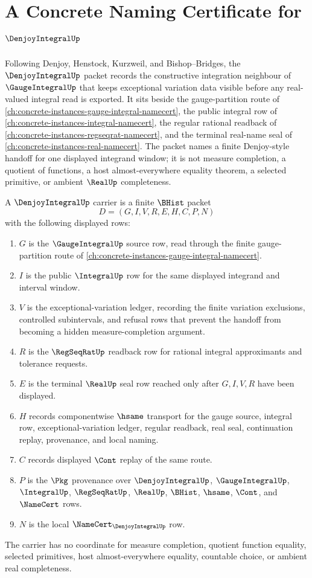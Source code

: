 \chapter{A Concrete Naming Certificate for $\DenjoyIntegralUp$}
\label{ch:concrete-instances-denjoy-integral-namecert}

Following Denjoy, Henstock, Kurzweil, and Bishop--Bridges, the $\DenjoyIntegralUp$ packet records the constructive integration neighbour of $\GaugeIntegralUp$ that keeps exceptional variation data visible before any real-valued integral read is exported. It sits beside the gauge-partition route of \autoref{ch:concrete-instances-gauge-integral-namecert}, the public integral row of \autoref{ch:concrete-instances-integral-namecert}, the regular rational readback of \autoref{ch:concrete-instances-regseqrat-namecert}, and the terminal real-name seal of \autoref{ch:concrete-instances-real-namecert}. The packet names a finite Denjoy-style handoff for one displayed integrand window; it is not measure completion, a quotient of functions, a host almost-everywhere equality theorem, a selected primitive, or ambient $\RealUp$ completeness.

\begin{definition}
\label{def:denjoy-integral-carrier}
A $\DenjoyIntegralUp$ carrier is a finite $\BHist$ packet
$$
D=(G,I,V,R,E,H,C,P,N)
$$
with the following displayed rows:
\begin{enumerate}
\item $G$ is the $\GaugeIntegralUp$ source row, read through the finite gauge-partition route of \autoref{ch:concrete-instances-gauge-integral-namecert}.
\item $I$ is the public $\IntegralUp$ row for the same displayed integrand and interval window.
\item $V$ is the exceptional-variation ledger, recording the finite variation exclusions, controlled subintervals, and refusal rows that prevent the handoff from becoming a hidden measure-completion argument.
\item $R$ is the $\RegSeqRatUp$ readback row for rational integral approximants and tolerance requests.
\item $E$ is the terminal $\RealUp$ seal row reached only after $G,I,V,R$ have been displayed.
\item $H$ records componentwise $\hsame$ transport for the gauge source, integral row, exceptional-variation ledger, regular readback, real seal, continuation replay, provenance, and local naming.
\item $C$ records displayed $\Cont$ replay of the same route.
\item $P$ is the $\Pkg$ provenance over $\DenjoyIntegralUp$, $\GaugeIntegralUp$, $\IntegralUp$, $\RegSeqRatUp$, $\RealUp$, $\BHist$, $\hsame$, $\Cont$, and $\NameCert$ rows.
\item $N$ is the local $\NameCert_{\DenjoyIntegralUp}$ row.
\end{enumerate}
The carrier has no coordinate for measure completion, quotient function equality, selected primitives, host almost-everywhere equality, countable choice, or ambient real completeness.
\end{definition}

